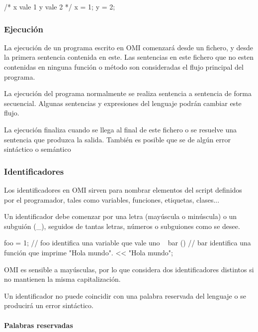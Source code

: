 \begin{myverbatim}
   /* 
      x vale 1
      y vale 2
   */
   x = 1; 
   y = 2; 
\end{myverbatim}
\subsubsection{Ejecución}\label{sec:execution}
La ejecución de un programa escrito en OMI comenzará desde un fichero, y desde la primera sentencia contenida en este. Las sentencias 
en este fichero que no esten contenidas en ninguna función o método son consideradas el flujo principal del programa.

La ejecución del programa normalmente se realiza sentencia a sentencia de forma secuencial. Algunas sentencias y expresiones del lenguaje podrán cambiar este flujo.

La ejecución finaliza cuando se llega al final de este fichero o se resuelve una sentencia que produzca la salida. También es posible que se de algún error sintáctico o semántico

\subsubsection{Identificadores}\label{sec:id}
Los identificadores en OMI sirven para nombrar elementos del script definidos por el programador,
tales como variables, funciones, etiquetas, clases...

Un identificador debe comenzar por una letra (mayúscula o minúscula) o un subguión (\_), seguidos de tantas letras, números o subguiones como se desee. \\

\begin{myverbatim}
   foo = 1;  // foo identifica una variable que vale uno
   ~ bar () { // bar identifica una función que imprime "Hola mundo".
      << "Hola mundo";
   } 
\end{myverbatim}

OMI es sensible a mayúsculas, por lo que considera dos identificadores distintos si no mantienen la misma capitalización.

Un identificador no puede coincidir con una palabra reservada del lenguaje o se producirá un error sintáctico.

\paragraph{Palabras reservadas}

